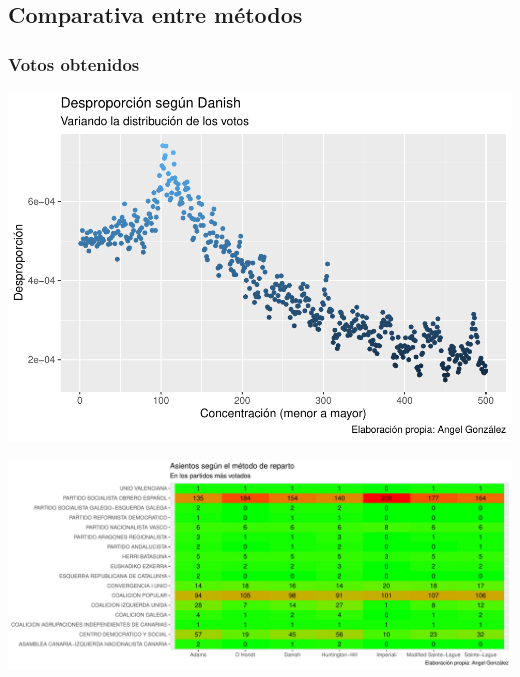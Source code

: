 \documentclass[12pt,a4paper,]{book}
\numberwithin{dummy}{section}
\theoremstyle{ocrenumbox}
\theoremstyle{blacknumex}
\theoremstyle{blacknumbox}
\theoremstyle{ocrenum}
\theoremstyle{ocrenum}
\begin{document}
\hypertarget{comparativa-entre-muxe9todos-11}{%
\subsection{Comparativa entre
métodos}\label{comparativa-entre-muxe9todos-11}}

\hypertarget{votos-obtenidos-11}{%
\subsubsection{Votos obtenidos}\label{votos-obtenidos-11}}

\begin{center}\includegraphics[width=1\linewidth]{figurasR/unnamed-chunk-38-1} \end{center}

\begin{center}\includegraphics[width=1\linewidth]{figurasR/unnamed-chunk-38-2} \end{center}
\end{document}
